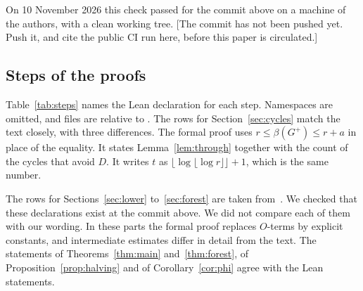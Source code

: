 \documentclass[11pt]{article}
\newcommand{\tbd}[1]{\textcolor{red!70!black}{[#1]}}
\theoremstyle{definition}
\theoremstyle{remark}
\begin{document}
On 10 November 2026 this check passed for the commit above on a machine of the authors, with a
clean working tree. \tbd{The commit has not been pushed yet. Push it, and cite the public CI run
here, before this paper is circulated.}

\subsection{Steps of the proofs}

Table~\ref{tab:steps} names the Lean declaration for each step. Namespaces are omitted, and files
are relative to . The rows for Section~\ref{sec:cycles} match the text closely,
with three differences. The formal proof uses $r\le\beta(G^{+})\le r+a$ in place of the equality.
It states Lemma~\ref{lem:through} together with the count of the cycles that avoid $D$. It writes
$t$ as $\lfloor\log\lfloor\log r\rfloor\rfloor+1$, which is the same number.

The rows for Sections~\ref{sec:lower} to~\ref{sec:forest} are taken from~\cite[Appendix~A]{KNT}. We
checked that these declarations exist at the commit above. We did not compare each of them with our
wording. In these parts the formal proof replaces $O$-terms by explicit constants, and intermediate
estimates differ in detail from the text. The statements of Theorems~\ref{thm:main}
and~\ref{thm:forest}, of Proposition~\ref{prop:halving} and of Corollary~\ref{cor:phi} agree with
the Lean statements.
\end{document}
